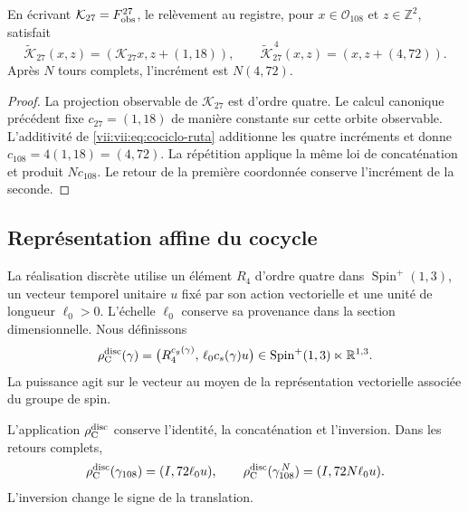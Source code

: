 \begin{proposition}
\label{vii:vii:prop:memoria-vuelta-completa}
En écrivant \(\mathcal K_{27}=F_{\rm obs}^{27}\), le relèvement
au registre, pour \(x\in\mathcal O_{108}\) et \(z\in\mathbb Z^2\), satisfait
\[
 \widetilde{\mathcal K}_{27}(x,z)
   =(\mathcal K_{27}x,z+(1,18)),\qquad
 \widetilde{\mathcal K}_{27}^{\,4}(x,z)
   =(x,z+(4,72)).
\]
Après \(N\) tours complets, l'incrément est \(N(4,72)\).
\end{proposition}

\begin{proof}
La projection observable de \(\mathcal K_{27}\) est d'ordre quatre. Le calcul canonique précédent fixe \(c_{27}=(1,18)\) de manière constante sur cette orbite observable. L'additivité de \eqref{vii:vii:eq:cociclo-ruta} additionne les quatre incréments et donne \(c_{108}=4(1,18)=(4,72)\). La répétition applique la même loi de concaténation et produit \(Nc_{108}\). Le retour de la première coordonnée conserve l'incrément de la seconde.
\end{proof}

\subsection{Représentation affine du cocycle}
\label{vii:vii:subsec:representacion-afin-cociclo}

La réalisation discrète utilise un élément \(R_4\) d'ordre quatre dans
\(\operatorname{Spin}^+(1,3)\), un vecteur temporel unitaire \(u\)
fixé par son action vectorielle et une unité de longueur \(\ell_0>0\).
L'échelle \(\ell_0\) conserve sa provenance dans la section dimensionnelle.
Nous définissons
\begin{equation}
 \rho_{\rm C}^{\rm disc}(\gamma)=
 \bigl(R_4^{c_g(\gamma)},\,\ell_0c_s(\gamma)u\bigr)
 \in\operatorname{Spin}^+(1,3)\ltimes\mathbb R^{1,3}.
 \label{vii:vii:eq:representacion-discreta-memoria}
\end{equation}
La puissance agit sur le vecteur au moyen de la représentation vectorielle
associée du groupe de spin.

\begin{theorem}
\label{vii:vii:thm:traslacion-memoria}
L'application \(\rho_{\rm C}^{\rm disc}\) conserve l'identité,
la concaténation et l'inversion. Dans les retours complets,
\begin{equation}
 \rho_{\rm C}^{\rm disc}(\gamma_{108})=(I,72\ell_0u),\qquad
 \rho_{\rm C}^{\rm disc}(\gamma_{108}^{\,N})=(I,72N\ell_0u).
 \label{vii:vii:eq:traslacion-retorno-108}
\end{equation}
L'inversion change le signe de la translation.
\end{theorem}

